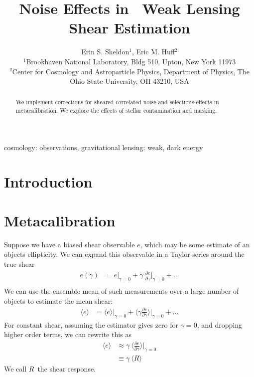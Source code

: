 \documentclass[usegraphicx,usenatbib]{mn2e}
\title{Noise Effects in \Mcal\ Weak Lensing Shear Estimation}
\author[Sheldon et al.]{Erin S. Sheldon$^1$, Eric M. Huff$^2$\\
$^1$Brookhaven National Laboratory, Bldg 510, Upton, New York 11973\\
$^2$Center for Cosmology and Astroparticle Physics, Department of Physics, The Ohio State University, OH 43210, USA }
\newcommand{\est}{$e$}
\newcommand{\mest}{e}
\newcommand{\mcal}{metacalibration}
\newcommand{\mcalR}{$R$}
\begin{document}
\maketitle

\begin{abstract}

We implement corrections for sheared correlated noise and selections effects in
\mcal. We explore the effects of stellar contamination and masking.   

\end{abstract}


\begin{keywords}                                                                    
    cosmology: observations,
    gravitational lensing: weak,
    dark energy
\end{keywords} 

\section{Introduction} \label{sec:intro}

\section{Metacalibration} \label{sec:algo}

Suppose we have a biased shear observable \est, which may be some estimate of
an objects ellipticity. We can expand this observable in a Taylor
series around the true shear
\begin{align} \label{eq:Eexpand}
    \mest(\gamma) &= \mest|_{\gamma=0} + \gamma ~ \frac{ \partial \mest }{ \partial \gamma }\bigg|_{\gamma=0}  + ... \\
\end{align}
We can use the ensemble mean of such measurements over a large number of objects
to estimate the mean shear:
\begin{align}
    \langle \mest \rangle &= \langle \mest \rangle |_{\gamma=0} + \langle \gamma \frac{ \partial \mest }{ \partial \gamma } \rangle \bigg|_{\gamma=0} + ...
\end{align}
For constant shear, assuming the estimator gives zero for $\gamma=0$, and
dropping higher order terms, we can rewrite this as
\begin{align}
    \langle \mest \rangle &\approx  \gamma ~ \langle \frac{ \partial \mest }{ \partial \gamma } \rangle \bigg|_{\gamma=0}  \\
      & \equiv  \gamma ~ \langle \mbox{\mcalR} \rangle \nonumber
\end{align}
We call \mcalR\ the shear response.
\end{document}
